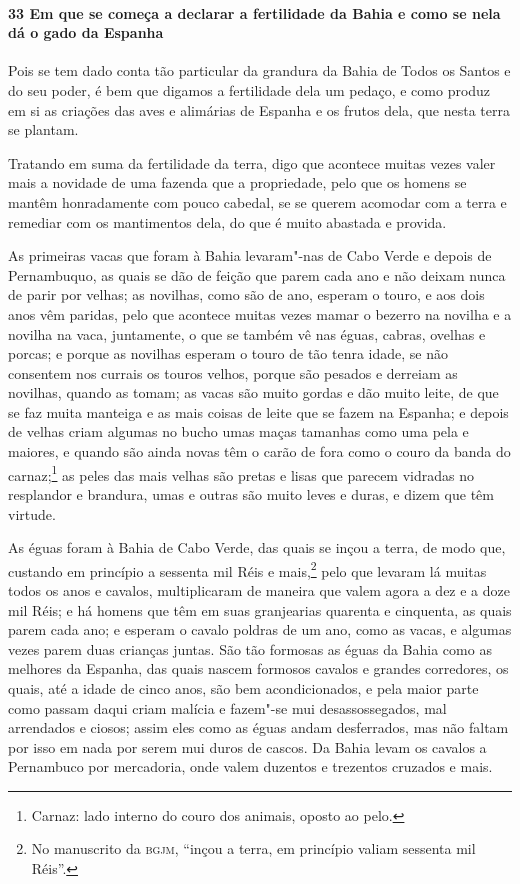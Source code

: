 \paragraph{33 Em que se começa a declarar a fertilidade da Bahia e como se nela dá o gado
da Espanha}

Pois se tem dado conta tão particular da grandura da Bahia de Todos os Santos e do seu
poder, é bem que digamos a fertilidade dela um pedaço, e como produz em si as criações das
aves e alimárias de Espanha e os frutos dela, que nesta terra se plantam.

Tratando em suma da fertilidade da terra, digo que acontece muitas vezes valer mais a
novidade de uma fazenda que a propriedade, pelo que os homens se mantêm honradamente com
pouco cabedal, se se querem acomodar com a terra e remediar com os mantimentos dela, do
que é muito abastada e provida.

As primeiras vacas que foram à Bahia levaram"-nas de Cabo Verde e depois de Pernambuquo, as
quais se dão de feição que parem cada ano e não deixam nunca de parir por velhas; as
novilhas, como são de ano, esperam o touro, e aos dois anos vêm paridas, pelo que acontece
muitas vezes mamar o bezerro na novilha e a novilha na vaca, juntamente, o que se também
vê nas éguas, cabras, ovelhas e porcas; e porque as novilhas esperam o touro de tão tenra
idade, se não consentem nos currais os touros velhos, porque são pesados e derreiam as
novilhas, quando as tomam; as vacas são muito gordas e dão muito leite, de que se faz
muita manteiga e as mais coisas de leite que se fazem na Espanha; e depois de velhas criam
algumas no bucho umas maças tamanhas como uma pela e maiores, e quando são ainda novas têm
o carão de fora como o couro da banda do carnaz;\footnote{ Carnaz: lado interno do couro
dos animais, oposto ao pelo.} as peles das mais velhas são pretas e lisas que parecem
vidradas no resplandor e brandura, umas e outras são muito leves e duras, e dizem que têm
virtude.

As éguas foram à Bahia de Cabo Verde, das quais se inçou a terra, de modo que, custando em
princípio a sessenta mil Réis e mais,\footnote{ No manuscrito da \textsc{bgjm}, ``inçou a
terra, em princípio valiam sessenta mil Réis''.} pelo que levaram lá muitas todos os anos
e cavalos, multiplicaram de maneira que valem agora a dez e a doze mil Réis; e há homens
que têm em suas granjearias quarenta e cinquenta, as quais parem cada ano; e esperam o
cavalo poldras de um ano, como as vacas, e algumas vezes parem duas crianças juntas. São
tão formosas as éguas da Bahia como as melhores da Espanha, das quais nascem formosos
cavalos e grandes corredores, os quais, até a idade de cinco anos, são bem acondicionados,
e pela maior parte como passam daqui criam malícia e fazem"-se mui desassossegados, mal
arrendados e ciosos; assim eles como as éguas andam desferrados, mas não faltam por isso
em nada por serem mui duros de cascos. Da Bahia levam os cavalos a Pernambuco por
mercadoria, onde valem duzentos e trezentos cruzados e mais.

